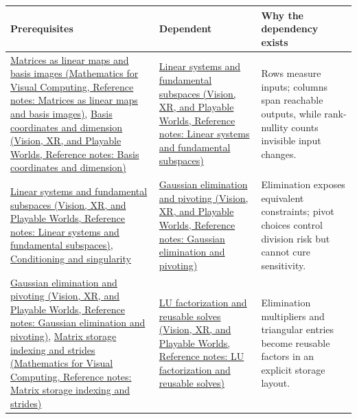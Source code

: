 {\def\LTcaptype{none} %
\begin{longtable}[]{@{}
  >{\raggedright\arraybackslash}p{}
  >{\raggedright\arraybackslash}p{}
  >{\raggedright\arraybackslash}p{}@{}}
\toprule\noalign{}
\begin{minipage}[b]{\linewidth}\raggedright
Prerequisites
\end{minipage} & \begin{minipage}[b]{\linewidth}\raggedright
Dependent
\end{minipage} & \begin{minipage}[b]{\linewidth}\raggedright
Why the dependency exists
\end{minipage} \\
\midrule\noalign{}
\endhead
\bottomrule\noalign{}
\endlastfoot
\href{../02-Mathematics-for-Visual-Computing/main.pdf\#nameddest=appendix-bd39c3bf5d64}{Matrices as linear maps and basis images (Mathematics for Visual Computing, Reference notes: Matrices as linear maps and basis images)}, \href{../07-Vision-XR-and-Playable-Worlds/main.pdf\#nameddest=appendix-ce0341f7ea0d}{Basis coordinates and dimension (Vision, XR, and Playable Worlds, Reference notes: Basis coordinates and dimension)} & \href{../07-Vision-XR-and-Playable-Worlds/main.pdf\#nameddest=appendix-8572a4a060c1}{Linear systems and fundamental subspaces (Vision, XR, and Playable Worlds, Reference notes: Linear systems and fundamental subspaces)} & Rows measure inputs; columns span reachable outputs, while rank-nullity counts invisible input changes. \\
\href{../07-Vision-XR-and-Playable-Worlds/main.pdf\#nameddest=appendix-8572a4a060c1}{Linear systems and fundamental subspaces (Vision, XR, and Playable Worlds, Reference notes: Linear systems and fundamental subspaces)}, \hyperref[appendix-8f6a01f284a7]{Conditioning and singularity} & \href{../07-Vision-XR-and-Playable-Worlds/main.pdf\#nameddest=appendix-f6e77f4a200f}{Gaussian elimination and pivoting (Vision, XR, and Playable Worlds, Reference notes: Gaussian elimination and pivoting)} & Elimination exposes equivalent constraints; pivot choices control division risk but cannot cure sensitivity. \\
\href{../07-Vision-XR-and-Playable-Worlds/main.pdf\#nameddest=appendix-f6e77f4a200f}{Gaussian elimination and pivoting (Vision, XR, and Playable Worlds, Reference notes: Gaussian elimination and pivoting)}, \href{../02-Mathematics-for-Visual-Computing/main.pdf\#nameddest=appendix-ffdc1d4e5350}{Matrix storage indexing and strides (Mathematics for Visual Computing, Reference notes: Matrix storage indexing and strides)} & \href{../07-Vision-XR-and-Playable-Worlds/main.pdf\#nameddest=appendix-55e4b5b0a1e6}{LU factorization and reusable solves (Vision, XR, and Playable Worlds, Reference notes: LU factorization and reusable solves)} & Elimination multipliers and triangular entries become reusable factors in an explicit storage layout. \\

\end{longtable}}

